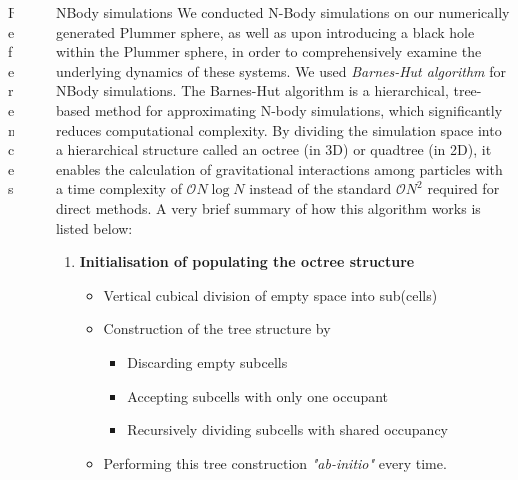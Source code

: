 \documentclass[final]{beamer}
\newlength{\sepwidth}
\newlength{\colwidth}
\newcommand{\separatorcolumn}{\begin{column}{\sepwidth}\end{column}}
\begin{document}
\begin{frame}[t]
\begin{columns}[t]
\begin{column}{\colwidth}
  \begin{block}{References}

    \nocite{*}
    \footnotesize{}

  \end{block}


\end{column}

\separatorcolumn

\begin{column}{\colwidth}


\begin{block}{NBody simulations}
We conducted N-Body simulations on our numerically generated Plummer sphere, as well as upon introducing a black hole within the Plummer sphere, in order to comprehensively examine the underlying dynamics of these systems. We used \textit{Barnes-Hut algorithm} for NBody simulations.
The Barnes-Hut algorithm is a hierarchical, tree-based method for approximating N-body simulations, which significantly reduces computational complexity. By dividing the simulation space into a hierarchical structure called an octree (in 3D) or quadtree (in 2D), it enables the calculation of gravitational interactions among particles with a time complexity of $\mathcal{O}{N \log N}$ instead of the standard $\mathcal{O}{N^2}$ required for direct methods. A very brief summary of how this algorithm works is listed below:
\begin{enumerate}
    

 \item  \textbf{Initialisation of populating the octree structure} \\
 \begin{itemize}
        \item Vertical cubical division of empty space into sub(cells)
        \item Construction of the tree structure by 
        \begin{itemize}
            \item Discarding empty subcells 
            \item Accepting subcells with only one occupant
            \item Recursively dividing subcells with shared occupancy
        \end{itemize}
        \item Performing this tree construction \textit{"ab-initio"} every time.
    \end{itemize}


\end{enumerate}
\end{block}
\end{column}
\end{columns}
\end{frame}
\end{document}

